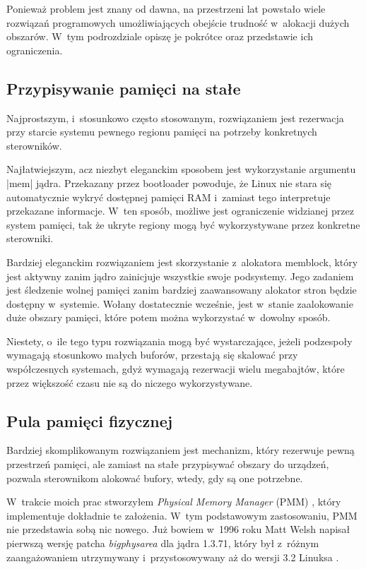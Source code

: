 Ponieważ problem jest znany od dawna, na przestrzeni lat powstało
wiele rozwiązań programowych umożliwiających obejście trudność
w~alokacji dużych obszarów.  W~tym podrozdziale opiszę je pokrótce
oraz przedstawie ich ograniczenia.

\subsection{Przypisywanie pamięci na stałe}

Najprostszym, i~stosunkowo często stosowanym, rozwiązaniem jest
rezerwacja przy starcie systemu pewnego regionu pamięci na potrzeby
konkretnych sterowników.

Najłatwiejszym, acz niezbyt eleganckim sposobem jest wykorzystanie
argumentu \code|mem| jądra.  Przekazany przez bootloader powoduje, że
Linux nie stara się automatycznie wykryć dostępnej pamięci RAM
i~zamiast tego interpretuje przekazane informacje.  W~ten sposób,
możliwe jest ograniczenie widzianej przez system pamięci, tak że
ukryte regiony mogą być wykorzystywane przez konkretne sterowniki.

Bardziej eleganckim rozwiązaniem jest skorzystanie z~alokatora
memblock, który jest aktywny zanim jądro zainicjuje wszystkie swoje
podsystemy.  Jego zadaniem jest śledzenie wolnej pamięci zanim
bardziej zaawansowany alokator stron będzie dostępny w~systemie.
Wołany dostatecznie wcześnie, jest w~stanie zaalokowanie duże obszary
pamięci, które potem można wykorzystać w~dowolny sposób.

Niestety, o~ile tego typu rozwiązania mogą być wystarczające, jeżeli
podzespoły wymagają stosunkowo małych buforów, przestają się skalować
przy współczesnych systemach, gdyż wymagają rezerwacji wielu
megabajtów, które przez większość czasu nie są do niczego
wykorzystywane.

\subsection{Pula pamięci fizycznej}

Bardziej skomplikowanym rozwiązaniem jest mechanizm, który rezerwuje
pewną przestrzeń pamięci, ale zamiast na stałe przypisywać obszary do
urządzeń, pozwala sterownikom alokować bufory, wtedy, gdy są one
potrzebne.

W~trakcie moich prac stworzyłem \textit{Physical Memory Manager} (PMM)
\autocite{patch:pmm}, który implementuje dokładnie te założenia. W~tym
podstawowym zastosowaniu, PMM nie przedstawia sobą nic nowego.  Już
bowiem w~1996 roku Matt Welsh napisał pierwszą wersję patcha
\emph{bigphysarea} dla jądra 1.3.71, który był z~różnym zaangażowaniem
utrzymywany i~przystosowywany aż do wersji 3.2 Linuksa
\autocite{patch:bigphys}.

